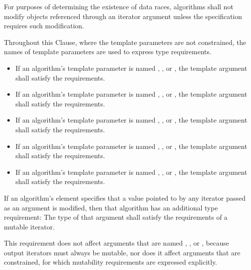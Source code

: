 \pnum
For purposes of determining the existence of data races, algorithms shall
not modify objects referenced through an iterator argument unless the
specification requires such modification.

\pnum
Throughout this Clause, where the template parameters are not constrained,
the names of template parameters
are used to express type requirements.
\begin{itemize}
\item
If an algorithm's template parameter is named
,
,
or
,
the template argument shall satisfy the
 requirements.
\item
If an algorithm's template parameter is named
,
,
or
,
the template argument shall satisfy the
 requirements.
\item
If an algorithm's template parameter is named
,
,
or
,
the template argument shall satisfy the
 requirements.
\item
If an algorithm's template parameter is named
,
,
or
,
the template argument shall satisfy the
 requirements.
\item
If an algorithm's template parameter is named
,
,
or
,
the template argument shall satisfy the
 requirements.
\end{itemize}

\pnum
If an algorithm's
\effects
element specifies that a value pointed to by any iterator passed
as an argument is modified, then that algorithm has an additional
type requirement:
The type of that argument shall satisfy the requirements
of a mutable iterator.
\begin{note}
This requirement does not affect arguments that are named
,
,
or
,
because output iterators must always be mutable, nor does it affect
arguments that are constrained, for which mutability requirements are expressed
explicitly.
\end{note}

